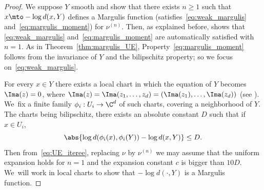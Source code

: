 \begin{proof}
We suppose $Y$ smooth and show that there exists $n\geq 1$ such that
$x\mto - \log d(x, Y)$ defines a
Margulis function (\ie satisfies~\eqref{eq:weak_margulis} and~\eqref{eq:margulis_moment})
for $\nu^{(n)}$. Then, as explained before, \cite{benard-desaxce} shows that \eqref{eq:weak_margulis} and~\eqref{eq:margulis_moment} are automatically satisfied with $n=1$. As in Theorem~\ref{thm:margulis_UE}, Property~\eqref{eq:margulis_moment} follows from the invariance of $Y$ and
the bilipschitz property; so we focus on~\eqref{eq:weak_margulis}.

For every $x\in Y$ there exists a local chart in which
the equation of $Y$ becomes $\Ima (z) = 0$, where $\Ima(z) = \Ima (z_1, \ldots , z_d) =
(\Ima (z_1), \ldots , \Ima (z_d))$ (see \cite[Prop.\,1.3.8 \& 1.3.11]{BER}). We~fix
a finite family $\phi_i: U_i\to \C^d$ of such charts,
covering a neighborhood of $Y$. The charts being bilipschitz,
there exists an absolute constant $D$ such that if $x\in U_i$,
\[
\abs{\log d(\phi_i(x), \phi_i(Y)) - \log d(x,Y)}\leq D.
\] Then from~\eqref{eq:UE_iteree}, replacing
$\nu$ by $\nu^{(n)}$ we may assume that the uniform expansion holds for $n=1$ and the expansion
constant $c$ is bigger than $10D$. We~will work in local charts to show that $-\log d(\cdot, Y)$ is a Margulis function.


\end{proof}
